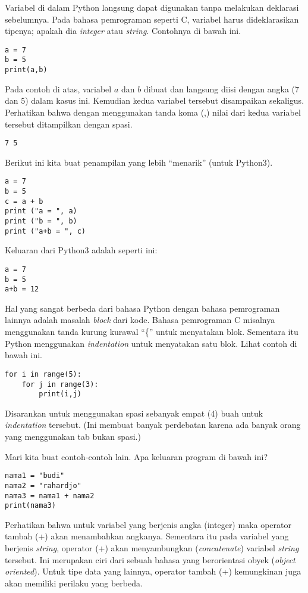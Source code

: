 Variabel di dalam Python langsung dapat digunakan tanpa melakukan deklarasi
sebelumnya. Pada bahasa pemrograman seperti C, variabel harus dideklarasikan
tipenya; apakah dia {\em integer} atau {\em string}.
Contohnya di bawah ini.
\begin{verbatim}
a = 7
b = 5
print(a,b)
\end{verbatim}
Pada contoh di atas, variabel $a$ dan $b$ dibuat dan langsung diisi dengan
angka (7 dan 5) dalam kasus ini.
Kemudian kedua variabel tersebut disampaikan sekaligus.
Perhatikan bahwa dengan menggunakan tanda koma (,) nilai dari kedua variabel
tersebut ditampilkan dengan spasi.

\begin{verbatim}
7 5
\end{verbatim}

Berikut ini kita buat penampilan yang lebih ``menarik'' (untuk Python3).
\begin{verbatim}
a = 7
b = 5
c = a + b
print ("a = ", a)
print ("b = ", b)
print ("a+b = ", c)
\end{verbatim}

Keluaran dari Python3 adalah seperti ini:
\begin{verbatim}
a = 7
b = 5
a+b = 12
\end{verbatim}

Hal yang sangat berbeda dari bahasa Python dengan
bahasa pemrograman lainnya adalah masalah {\em block} dari kode. 
Bahasa pemrograman C misalnya menggunakan tanda kurung kurawal ``\{'' 
untuk menyatakan blok. Sementara itu Python menggunakan {\em indentation} 
untuk menyatakan satu blok. Lihat contoh di bawah ini.

\begin{verbatim}
for i in range(5):
    for j in range(3):
        print(i,j)
\end{verbatim}

Disarankan untuk menggunakan spasi sebanyak empat (4) buah untuk {\em
indentation} tersebut. (Ini membuat banyak perdebatan karena ada banyak orang
yang menggunakan tab bukan spasi.)

Mari kita buat contoh-contoh lain. Apa keluaran program di bawah ini?
\begin{verbatim}
nama1 = "budi"
nama2 = "rahardjo"
nama3 = nama1 + nama2
print(nama3)
\end{verbatim}

Perhatikan bahwa untuk variabel yang berjenis angka (integer) maka operator 
tambah (+) akan menambahkan angkanya. Sementara itu pada variabel yang
berjenis {\em string}, operator (+) akan menyambungkan ({\em concatenate})
variabel {\em string} tersebut.
Ini merupakan ciri dari sebuah bahasa yang berorientasi obyek
({\em object oriented}).
Untuk tipe data yang lainnya, operator tambah (+) kemungkinan juga akan
memiliki perilaku yang berbeda.
    
